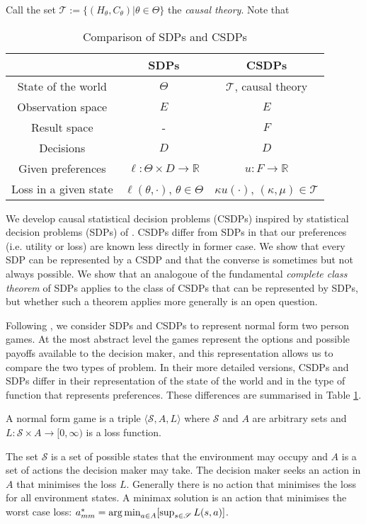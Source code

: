 Call the set $\mathscr{T}:=\{(H_\theta, C_\theta)|\theta\in \Theta\}$ the \emph{causal theory}. Note that 


\vspace{-3mm}
\begin{table}[ht]
    \centering
\begin{tabular}{ |c|c|c| } 
 \hline
  & SDPs & CSDPs \\ 
 \hline
 State of the world & $\Theta$ & $\mathscr{T}$, causal theory \\ 
 Observation space & $E$ & $E$ \\ 
 Result space & - & $F$ \\
 Decisions & $D$ & $D$ \\
 Given preferences & $\ell:\Theta\times D\to \mathbb{R}$ & $u:F\to \mathbb{R}$ \\
 Loss in a given state & $\ell(\theta,\cdot)$, $\theta\in \Theta$ & $\kappa u (\cdot)$, $(\kappa,\mu)\in \mathscr{T}$\\
 \hline
\end{tabular}
    \caption{Comparison of SDPs and CSDPs}
    \label{tab:sdp_cdp_comparison}
\end{table}

We develop causal statistical decision problems (CSDPs) inspired by statistical decision problems (SDPs) of \citet{wald_statistical_1950}. CSDPs differ from SDPs in that our preferences (i.e. utility or loss) are known less directly in former case. We show that every SDP can be represented by a CSDP and that the converse is sometimes but not always possible. We show that an analogoue of the fundamental \emph{complete class theorem} of SDPs applies to the class of CSDPs that can be represented by SDPs, but whether such a theorem applies more generally is an open question.

Following \citep{toutenburg_ferguson_1967}, we consider SDPs and CSDPs to represent normal form two person games. At the most abstract level the games represent the options and possible payoffs available to the decision maker, and this representation allows us to compare the two types of problem. In their more detailed versions,  CSDPs and SDPs differ in their representation of the state of the world and in the type of function that represents preferences. These differences are summarised in Table \ref{tab:sdp_cdp_comparison}.

\begin{definition}
A normal form game is a triple $\langle \mathscr{S}, A, L\rangle$ where $\mathscr{S}$ and $A$ are arbitrary sets and $L:\mathscr{S}\times A\to [0,\infty)$ is a loss function.

\end{definition}
The set $\mathscr{S}$ is a set of possible states that the environment may occupy and $A$ is a set of actions the decision maker may take. The decision maker seeks an action in $A$ that minimises the loss $L$. Generally there is no action that minimises the loss for all environment states. A minimax solution is an action that minimises the worst case loss: $a^*_{mm} = \operatorname*{arg\,min}_{a\in A} [\sup_{s\in \mathscr{S}} L(s,a)]$.

